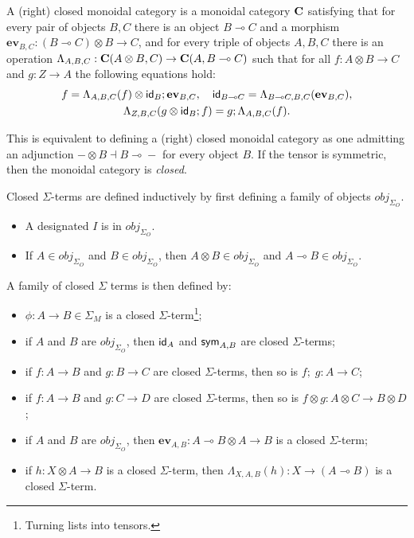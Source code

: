 \begin{definition}%
	\label{def:closed}
	A (right) closed monoidal category is a monoidal category $\mathbf{C}$ satisfying that for
	every pair of objects $B,C$ there is an object $B \multimap C$ and a morphism $\textbf{ev}_{B,C} : (B \multimap C) \otimes B \to
		C$, and for every triple of objects $A,B,C$ there is an operation $\Lambda_{A,B,C} : \mathbf{C}(A \otimes B,C) \to
		\mathbf{C}(A,B \multimap{} C)$ such that for all $f : A \otimes B \to C$ and $g : Z \to A$ the following equations hold:
	\begin{gather*}
		f = \Lambda_{A,B,C}(f) \otimes \textsf{id}_{B}; \textbf{ev}_{B,C},
		\quad
		\textsf{id}_{B \multimap{} C} = \Lambda_{B \multimap{} C,B,C}(\textbf{ev}_{B,C}),
		\\
		\Lambda_{Z,B,C}(g \otimes \textsf{id}_{B}; f) = g;\Lambda_{A,B,C}(f).
	\end{gather*}
\end{definition}

This is equivalent to defining a (right) closed monoidal category as one admitting an adjunction $- \otimes B \dashv B \multimap{} -$ for every object $B$.
If the tensor is symmetric, then the monoidal category is \emph{closed}.

\begin{definition}
	Closed $\Sigma$-terms are defined inductively by first defining a family of objects $obj_{\Sigma_{O}}$.
	\begin{itemize}
		\item A designated $I$ is in $obj_{\Sigma_{O}}$.
		\item If $A \in obj_{\Sigma_{O}}$ and $B \in obj_{\Sigma_{O}}$, then $A \otimes B \in obj_{\Sigma_{O}}$ and $A \multimap B \in obj_{\Sigma_{O}}$.
	\end{itemize}
	A family of closed $\Sigma$ terms is then defined by:
	\begin{itemize}
		\item $\phi \colon A \to B \in \Sigma_{M}$ is a closed $\Sigma$-term\footnote{Turning lists into tensors.};
		\item if $A$ and $B$ are $obj_{\Sigma_{O}}$, then $\textsf{id}_{A}$ and $\textsf{sym}_{A,B}$ are closed $\Sigma$-terms;
		\item if $f \colon A \to B$ and $g : B \to C$ are closed $\Sigma$-terms, then so is $f;\;g : A \to C$;
		\item if $f \colon A \to B$ and $g : C \to D$ are closed $\Sigma$-terms, then so is $f \otimes g \colon A \otimes C \to B \otimes D$;
		\item if $A$ and $B$ are $obj_{\Sigma_{O}}$, then $\textbf{ev}_{A,B} \colon A \multimap B \otimes A \to B$ is a closed $\Sigma$-term;
		\item if $h \colon X \otimes A \to B$ is a closed $\Sigma$-term, then $\Lambda_{X,A,B}(h) \colon X \to (A \multimap B)$ is a closed $\Sigma$-term.
	\end{itemize}
\end{definition}


